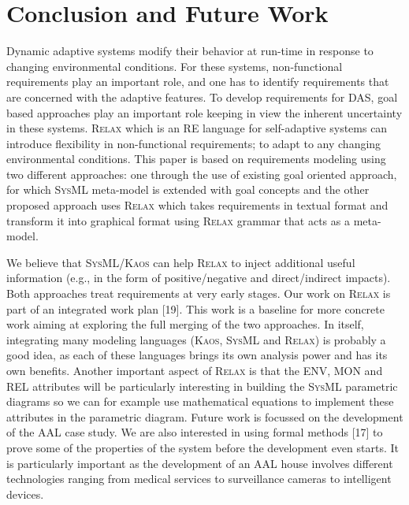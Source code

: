 \documentclass[10pt, conference, compsocconf]{IEEEtran}
\def\myrelax{\textsc{Relax}}                  %
\def\sysml{\textsc{SysML}}
\def\kaos{\textsc{Kaos}}
\begin{document}
\section{Conclusion and Future Work}\label{sec:Conclusion and Future Work}

Dynamic adaptive systems modify their behavior at run-time in response to changing environmental conditions. For these systems, non-functional requirements play an important role, and one has to identify requirements that are concerned with the adaptive features. To develop requirements for DAS, goal based approaches play an important role keeping in view the inherent uncertainty in these systems. \myrelax{} which is an RE language for self-adaptive systems can introduce flexibility in non-functional requirements; to adapt to any changing environmental conditions. This paper is based on requirements modeling using two different approaches: one through the use of existing goal oriented approach, for which \sysml{} meta-model is extended with goal concepts and the other proposed approach uses \myrelax{} which takes requirements in textual format and transform it into graphical format using \myrelax{} grammar that acts as a meta-model. 

We believe that \sysml{}/\kaos{} can help \myrelax{} to inject additional useful information (e.g., in the form of positive/negative and direct/indirect impacts). Both approaches treat requirements at very early stages. Our work on \myrelax{} is part of an integrated work plan [19]. This work is a baseline for more concrete work aiming at exploring the full merging of the two approaches. In itself, integrating many modeling languages (\kaos, \sysml{} and \myrelax{}) is probably a good idea, as each of these languages brings its own analysis power and has its own benefits. Another important aspect of \myrelax{} is that the ENV, MON and REL attributes will be particularly interesting in building the \sysml{} parametric diagrams so we can for example use mathematical equations to implement these attributes in the parametric diagram. Future work is focussed on the development of the AAL case study. We are also interested in using formal methods [17] to prove some of the properties of the system before the development even starts. It is particularly important as the development of an AAL house involves different technologies ranging from medical services to surveillance cameras to intelligent devices.
\end{document}
